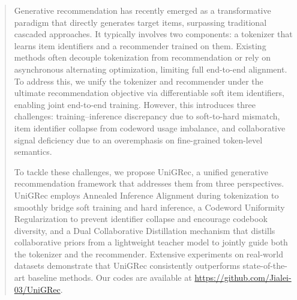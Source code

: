 \begin{abstract}

Generative recommendation has recently emerged as a transformative paradigm that directly generates target items, surpassing traditional cascaded approaches. It typically involves two components: a tokenizer that learns item identifiers and a recommender trained on them. Existing methods often decouple tokenization from recommendation or rely on asynchronous alternating optimization, limiting full end-to-end alignment. To address this, we unify the tokenizer and recommender under the ultimate recommendation objective via differentiable soft item identifiers, enabling joint end-to-end training. However, this introduces three challenges: training–inference discrepancy due to soft-to-hard mismatch, item identifier collapse from codeword usage imbalance, and collaborative signal deficiency due to an overemphasis on fine-grained token-level semantics.

To tackle these challenges, we propose UniGRec, a unified generative recommendation framework that addresses them from three perspectives. UniGRec employs Annealed Inference Alignment during tokenization to smoothly bridge soft training and hard inference, a Codeword Uniformity Regularization to prevent identifier collapse and encourage codebook diversity, and a Dual Collaborative Distillation mechanism that distills collaborative priors from a lightweight teacher model to jointly guide both the tokenizer and the recommender. Extensive experiments on real-world datasets demonstrate that UniGRec consistently outperforms state-of-the-art baseline methods. Our codes are available at \url{https://github.com/Jialei-03/UniGRec}.

\end{abstract}
